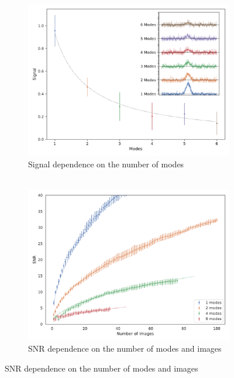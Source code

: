\begin{figure}
	\centering
	\begin{subfigure}[b]{0.48\textwidth}
		\includegraphics[width=\linewidth]{images/modes_signal.pdf}
		\caption{Signal dependence on the number of modes\\ ${}$}
		\label{fig:modes}
	\end{subfigure}
	\begin{subfigure}[b]{0.48\textwidth}
		\includegraphics[width=\linewidth]{images/SNRNimagesgrating.pdf}
		\caption{SNR dependence on the number of modes and images}
		\label{fig:SNRNimages}
	\end{subfigure}

\end{figure}
